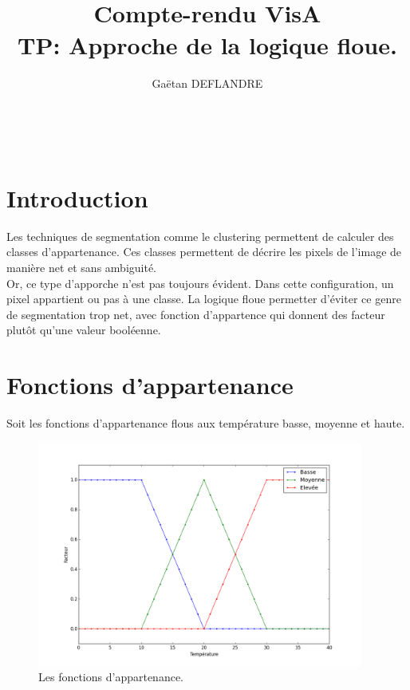 \documentclass[a4paper,11pt]{article}
\title{
  \noindent\hrulefill \\
  \vspace{10mm}
  \textbf{Compte-rendu VisA} \\
  \vspace{5mm}
  TP: Approche de la logique floue.
}
\author{Gaëtan DEFLANDRE}
\begin{document}
\maketitle
\noindent\hrulefill \\


\section*{Introduction}

Les techniques de segmentation comme le clustering permettent de 
calculer des classes d'appartenance. Ces classes permettent de 
décrire les pixels de l'image de manière net et sans ambiguité.\\

Or, ce type d'apporche n'est pas toujours évident. Dans cette 
configuration, un pixel appartient ou pas à une classe. La logique 
floue permetter d'éviter ce genre de segmentation trop net, avec 
fonction d'appartence qui donnent des facteur plutôt qu'une valeur 
booléenne.\\


\newpage


\section{Fonctions d'appartenance}

Soit les fonctions d'appartenance flous aux température basse, 
moyenne et haute.

\begin{figure}[H]
  \begin{center}
  \includegraphics[height=280px]{images/exercice1.png}
  \caption{Les fonctions d'appartenance.}
  \end{center}
\end{figure}
\end{document}
